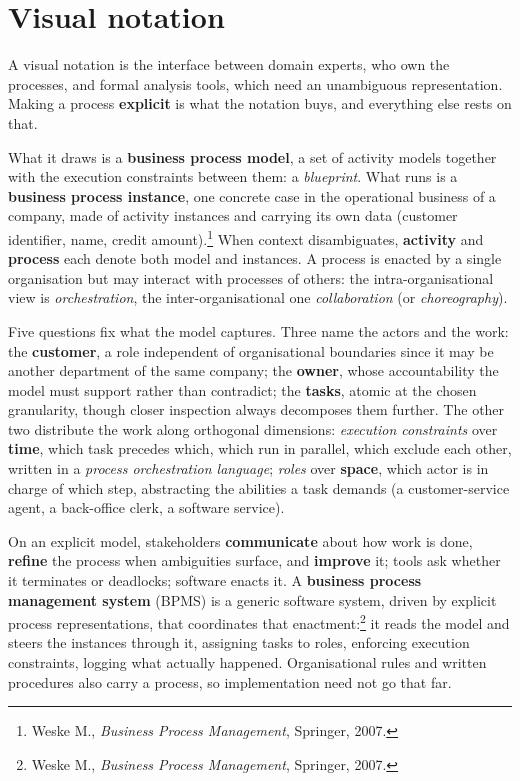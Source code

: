 \newpage
\section{Visual notation}

A visual notation is the interface between domain experts, who own the processes, and formal analysis tools, which need an unambiguous representation. Making a process \textbf{explicit} is what the notation buys, and everything else rests on that.

What it draws is a \textbf{business process model}, a set of activity models together with the execution constraints between them: a \emph{blueprint}. What runs is a \textbf{business process instance}, one concrete case in the operational business of a company, made of activity instances and carrying its own data (customer identifier, name, credit amount).\footnote{Weske M., \emph{Business Process Management}, Springer, 2007.} When context disambiguates, \textbf{activity} and \textbf{process} each denote both model and instances. A process is enacted by a single organisation but may interact with processes of others: the intra-organisational view is \emph{orchestration}, the inter-organisational one \emph{collaboration} (or \emph{choreography}).

Five questions fix what the model captures. Three name the actors and the work: the \textbf{customer}, a role independent of organisational boundaries since it may be another department of the same company; the \textbf{owner}, whose accountability the model must support rather than contradict; the \textbf{tasks}, atomic at the chosen granularity, though closer inspection always decomposes them further. The other two distribute the work along orthogonal dimensions: \emph{execution constraints} over \textbf{time}, which task precedes which, which run in parallel, which exclude each other, written in a \emph{process orchestration language}; \emph{roles} over \textbf{space}, which actor is in charge of which step, abstracting the abilities a task demands (a customer-service agent, a back-office clerk, a software service).

On an explicit model, stakeholders \textbf{communicate} about how work is done, \textbf{refine} the process when ambiguities surface, and \textbf{improve} it; tools ask whether it terminates or deadlocks; software enacts it. A \textbf{business process management system} (BPMS) is a generic software system, driven by explicit process representations, that coordinates that enactment:\footnote{Weske M., \emph{Business Process Management}, Springer, 2007.} it reads the model and steers the instances through it, assigning tasks to roles, enforcing execution constraints, logging what actually happened. Organisational rules and written procedures also carry a process, so implementation need not go that far.

